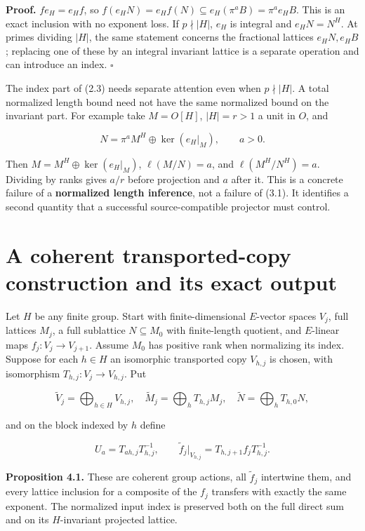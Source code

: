 \documentclass[11pt]{article}
\begin{document}
\textbf{Proof.} \(fe_H=e_Hf\), so \(f(e_HN)=e_Hf(N)\subseteq e_H(\pi^aB)=\pi^ae_HB\). This is an exact inclusion with no exponent loss. If \(p\nmid|H|\), \(e_H\) is integral and \(e_HN=N^H\). At primes dividing \(|H|\), the same statement concerns the fractional lattices \(e_HN,e_HB\); replacing one of these by an integral invariant lattice is a separate operation and can introduce an index. \(\square\)

The index part of (2.3) needs separate attention even when \(p\nmid|H|\). A total normalized length bound need not have the same normalized bound on the invariant part. For example take \(M=O[H]\), \(|H|=r>1\) a unit in \(O\), and

\[
 N=\pi^a M^H\oplus\ker(e_H|_M),\qquad a>0.
\]

Then \(M=M^H\oplus\ker(e_H|_M)\), \(\ell(M/N)=a\), and \(\ell(M^H/N^H)=a\). Dividing by ranks gives \(a/r\) before projection and \(a\) after it. This is a concrete failure of a \textbf{normalized length inference}, not a failure of (3.1). It identifies a second quantity that a successful source-compatible projector must control.

\section{A coherent transported-copy construction and its exact output}\label{a-coherent-transported-copy-construction-and-its-exact-output}

Let \(H\) be any finite group. Start with finite-dimensional \(E\)-vector spaces \(V_j\), full lattices \(M_j\), a full sublattice \(N\subseteq M_0\) with finite-length quotient, and \(E\)-linear maps \(f_j:V_j\to V_{j+1}\). Assume \(M_0\) has positive rank when normalizing its index. Suppose for each \(h\in H\) an isomorphic transported copy \(V_{h,j}\) is chosen, with isomorphism \(T_{h,j}:V_j\to V_{h,j}\). Put

\[
 \widetilde V_j=\bigoplus_{h\in H}V_{h,j},\quad
 \widetilde M_j=\bigoplus_hT_{h,j}M_j,\quad
 \widetilde N=\bigoplus_hT_{h,0}N,
\]

and on the block indexed by \(h\) define

\[
 U_a=T_{ah,j}T_{h,j}^{-1},\qquad
 \widetilde f_j|_{V_{h,j}}=T_{h,j+1}f_jT_{h,j}^{-1}.\tag{4.1}
\]

\textbf{Proposition 4.1.} These are coherent group actions, all \(\widetilde f_j\) intertwine them, and every lattice inclusion for a composite of the \(f_j\) transfers with exactly the same exponent. The normalized input index is preserved both on the full direct sum and on its \(H\)-invariant projected lattice.
\end{document}
